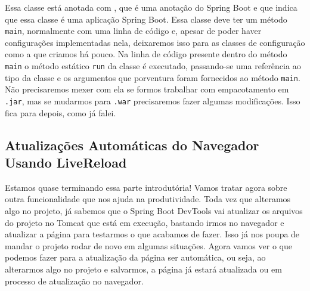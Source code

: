 Essa classe está anotada com , que é uma anotação do Spring Boot e que indica que essa classe é uma aplicação Spring Boot. Essa classe deve ter um método \texttt{main}, normalmente com uma linha de código e, apesar de poder haver configurações implementadas nela, deixaremos isso para as classes de configuração como a  que criamos há pouco. Na linha de código presente dentro do método \texttt{main} o método estático \texttt{run} da classe  é executado, passando-se uma referência ao tipo da classe  e os argumentos que porventura foram fornecidos ao método \texttt{main}. Não precisaremos mexer com ela se formos trabalhar com empacotamento em \texttt{.jar}, mas se mudarmos para \texttt{.war} precisaremos fazer algumas modificações. Isso fica para depois, como já falei.


\subsection{Atualizações Automáticas do Navegador Usando LiveReload}

Estamos quase terminando essa parte introdutória! Vamos tratar agora sobre outra funcionalidade que nos ajuda na produtividade. Toda vez que alteramos algo no projeto, já sabemos que o Spring Boot DevTools vai atualizar os arquivos do projeto no Tomcat que está em execução, bastando irmos no navegador e atualizar a página para testarmos o que acabamos de fazer. Isso já nos poupa de mandar o projeto rodar de novo em algumas situações. Agora vamos ver o que podemos fazer para a atualização da página ser automática, ou seja, ao alterarmos algo no projeto e salvarmos, a página já estará atualizada ou em processo de atualização no navegador.

